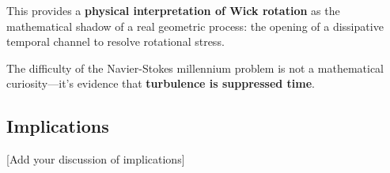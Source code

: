 \documentclass[11pt]{article}
\begin{document}
This provides a \textbf{physical interpretation of Wick rotation} as the mathematical shadow of a real geometric process: the opening of a dissipative temporal channel to resolve rotational stress.

The difficulty of the Navier-Stokes millennium problem is not a mathematical curiosity---it's evidence that \textbf{turbulence is suppressed time}.

\subsection{Implications}

[Add your discussion of implications]



\end{document}
